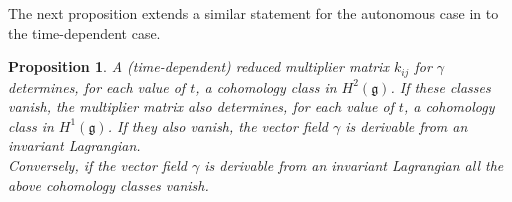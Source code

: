 \documentclass[11pt]{article}
\theoremstyle{plain}
\newtheorem{proposition}{Proposition}
\theoremstyle{definition}
\begin{document}

The next proposition extends a similar statement for the autonomous case in \cite{crampin2008invariantinv} to the time-dependent case.

\begin{proposition}\label{prop:cohomology} A (time-dependent) reduced multiplier matrix $k_{ij}$ for $\gamma$ determines, for each value of $t$, a cohomology class  in  $H^2(\mathfrak{g})$. If these classes vanish, the multiplier matrix also determines, for each value of $t$, a cohomology class  in $H^1(\mathfrak{g})$. If they also vanish, the vector field $\gamma$ is derivable from an invariant Lagrangian. \\
Conversely, if the vector field $\gamma$ is derivable from an invariant Lagrangian all the above  cohomology classes vanish.
\end{proposition}
\end{document}
